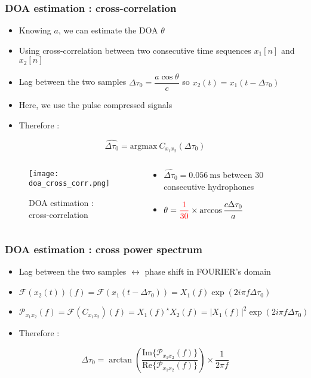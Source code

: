 \documentclass[UKenglish,8pt,aspectratio=1610]{beamer}
\begin{document}
\begin{frame}
	\frametitle{DOA estimation : cross-correlation}
\begin{itemize}
	\item Knowing $a$, we can estimate the DOA $\theta$
	\item Using cross-correlation between two consecutive time sequences $x_1[n]$ and $x_2[n]$
	\item Lag between the two samples $\Delta\tau_0=\dfrac{a\cos\theta}{c}$ so $x_2(t)=x_1(t-\Delta\tau_0)$
	\item Here, we use the pulse compressed signals
	\item Therefore :
\end{itemize}
\begin{equation}
	\hat{\Delta\tau_0}=\mathrm{argmax}~C_{x_1x_2}(\Delta\tau_0)
\end{equation}
	\begin{columns}
	\begin{column}{0.5\textwidth}
		\vspace{-25pt}
		\begin{figure}[h!]
			\texttt{[image: doa\_cross\_corr.png]}
			\centering
			\caption{DOA estimation : cross-correlation}
		\end{figure}
	\end{column}
	\begin{column}{0.5\textwidth}
		\begin{itemize}
		\item $\hat{\Delta\tau_0}=0.056~\si{\milli\second}$ between 30 consecutive hydrophones
		\item $\theta=\textcolor{red}{\dfrac{1}{30}}\times\arccos\dfrac{c\Delta\tau_0}{a}$
		\end{itemize}
	\end{column}
\end{columns} 
\end{frame}


\begin{frame}
	\frametitle{DOA estimation : cross power spectrum}
	\begin{itemize}
	\item Lag between the two samples $\leftrightarrow$ phase shift in FOURIER's domain
	\item $\mathcal{F}(x_2(t))(f)=\mathcal{F}(x_1(t-\Delta\tau_0))=X_1(f)\exp(2i\pi f\Delta\tau_0)$
	\item $\mathcal{P}_{x_1x_2}(f)=\mathcal{F}(C_{x_1x_2})(f)=X_1(f)^\star X_2(f)=\rvert X_1(f)\rvert^2 \exp(2i\pi f\Delta\tau_0)$
	\item Therefore :
\end{itemize}
\begin{equation}
	\Delta\tau_0 =\arctan\left( \dfrac{\mathrm{Im}\{\mathcal{P}_{x_1x_2}(f)\}}{\mathrm{Re}\{\mathcal{P}_{x_1x_2}(f)\}}\right)\times\dfrac{1}{2\pi f}
\end{equation}
\end{frame}
\end{document}
